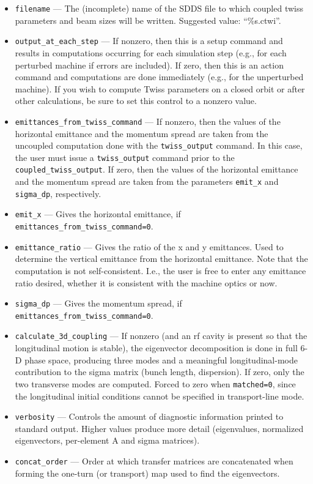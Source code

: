 \documentclass[11pt]{article}
\begin{document}
\begin{itemize}

\item \verb|filename| --- The (incomplete) name of the SDDS file to which coupled twiss parameters and
  beam sizes will be written.  Suggested value: ``\%s.ctwi''.
\item \verb|output_at_each_step| --- If nonzero, then this is a setup
  command and results in computations occurring for each simulation
  step (e.g., for each perturbed machine if errors are included).  If
  zero, then this is an action command and computations are done
  immediately (e.g., for the unperturbed machine). If you wish to compute Twiss parameters on a closed orbit or after other calculations,
  be sure to set this control to a nonzero value.
\item \verb|emittances_from_twiss_command| --- If nonzero, then the values of the horizontal emittance
  and the momentum spread are taken from the uncoupled computation done with the \verb|twiss_output| command.
  In this case, the user must issue a \verb|twiss_output| command prior to the \verb|coupled_twiss_output|.
  If zero, then the values of the horizontal emittance
  and the momentum spread are taken from the parameters \verb|emit_x| and \verb|sigma_dp|, respectively.
\item \verb|emit_x| --- Gives the horizontal emittance, if \verb|emittances_from_twiss_command=0|.
\item \verb|emittance_ratio| --- Gives the ratio of the x and y emittances.  Used to determine the
  vertical emittance from the horizontal emittance.  Note that the computation is not self-consistent.
  I.e., the user is free to enter any emittance ratio desired, whether it is consistent with the
  machine optics or now.
\item \verb|sigma_dp| ---  Gives the momentum spread, if \verb|emittances_from_twiss_command=0|.
\item \verb|calculate_3d_coupling| --- If nonzero (and an rf cavity is present so that the longitudinal
  motion is stable), the eigenvector decomposition is done in full 6-D phase space, producing
  three modes and a meaningful longitudinal-mode contribution to the sigma matrix (bunch length,
  dispersion).  If zero, only the two transverse modes are computed.  Forced to zero when
  \verb|matched=0|, since the longitudinal initial conditions cannot be specified in transport-line
  mode.
\item \verb|verbosity| --- Controls the amount of diagnostic information printed to standard output.
  Higher values produce more detail (eigenvalues, normalized eigenvectors, per-element A and sigma
  matrices).
\item \verb|concat_order| --- Order at which transfer matrices are concatenated when forming the
  one-turn (or transport) map used to find the eigenvectors.


\end{itemize}
\end{document}
